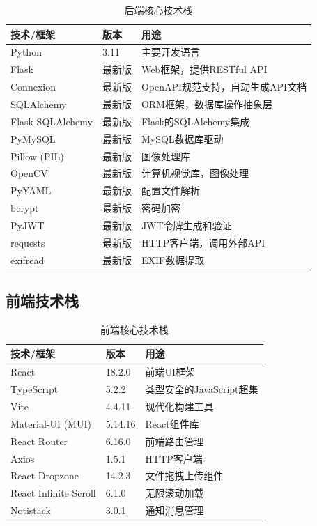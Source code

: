 \documentclass[12pt,a4paper]{article}
\begin{document}
\begin{table}[h]
\centering
\caption{后端核心技术栈}
\begin{tabularx}{\textwidth}{|X|X|X|}
\hline
\textbf{技术/框架} & \textbf{版本} & \textbf{用途} \\
\hline
Python & 3.11 & 主要开发语言 \\
\hline
Flask & 最新版 & Web框架，提供RESTful API \\
\hline
Connexion & 最新版 & OpenAPI规范支持，自动生成API文档 \\
\hline
SQLAlchemy & 最新版 & ORM框架，数据库操作抽象层 \\
\hline
Flask-SQLAlchemy & 最新版 & Flask的SQLAlchemy集成 \\
\hline
PyMySQL & 最新版 & MySQL数据库驱动 \\
\hline
Pillow (PIL) & 最新版 & 图像处理库 \\
\hline
OpenCV & 最新版 & 计算机视觉库，图像处理 \\
\hline
PyYAML & 最新版 & 配置文件解析 \\
\hline
bcrypt & 最新版 & 密码加密 \\
\hline
PyJWT & 最新版 & JWT令牌生成和验证 \\
\hline
requests & 最新版 & HTTP客户端，调用外部API \\
\hline
exifread & 最新版 & EXIF数据提取 \\
\hline
\end{tabularx}
\end{table}

\subsection{前端技术栈}

\begin{table}[h]
\centering
\caption{前端核心技术栈}
\begin{tabularx}{\textwidth}{|X|X|X|}
\hline
\textbf{技术/框架} & \textbf{版本} & \textbf{用途} \\
\hline
React & 18.2.0 & 前端UI框架 \\
\hline
TypeScript & 5.2.2 & 类型安全的JavaScript超集 \\
\hline
Vite & 4.4.11 & 现代化构建工具 \\
\hline
Material-UI (MUI) & 5.14.16 & React组件库 \\
\hline
React Router & 6.16.0 & 前端路由管理 \\
\hline
Axios & 1.5.1 & HTTP客户端 \\
\hline
React Dropzone & 14.2.3 & 文件拖拽上传组件 \\
\hline
React Infinite Scroll & 6.1.0 & 无限滚动加载 \\
\hline
Notistack & 3.0.1 & 通知消息管理 \\
\hline
\end{tabularx}
\end{table}
\end{document}
